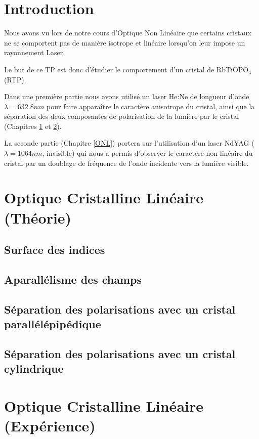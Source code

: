 \documentclass[a4paper,11pt]{report}
\begin{document}

\chapter*{Introduction} 
Nous avons vu lors de notre cours d'Optique Non Linéaire que certains cristaux ne se comportent pas de manière isotrope et linéaire lorsqu'on leur impose un rayonnement Laser.

Le but de ce TP est donc d'étudier le comportement d'un cristal de RbTiOPO$_4$ (RTP).

Dans une première partie nous avons utilisé un laser He:Ne de longueur d'onde $\lambda = 632.8nm$ pour faire apparaître le caractère anisotrope du cristal, ainsi que la séparation des deux composantes de polarisation de la lumière par le cristal (Chapitres \ref{OCLTheorie} et \ref{OCLExp}).

La seconde partie (Chapitre \ref{ONL}) portera sur l'utilisation d'un laser NdYAG ($\lambda = 1064nm$, invisible) qui nous a permis d'observer le caractère non linéaire du cristal par un doublage de fréquence de l'onde incidente vers la lumière visible.

\chapter{Optique Cristalline Linéaire (Théorie)} \label{OCLTheorie}
\section{Surface des indices}
\section{Aparallélisme des champs}
\section{Séparation des polarisations avec un cristal parallélépipédique}
\section{Séparation des polarisations avec un cristal cylindrique}

\chapter{Optique Cristalline Linéaire (Expérience)} \label{OCLExp}
\end{document}
